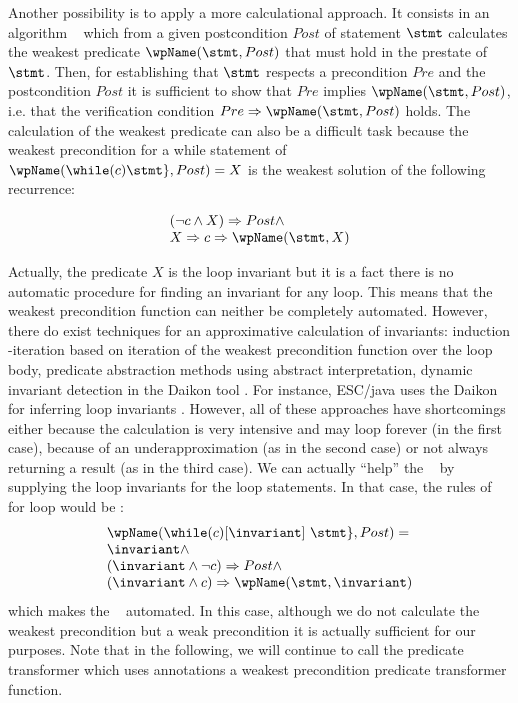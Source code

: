 Another possibility is to apply a  more calculational approach. It consists in an algorithm \wpName~ which 
from a given postcondition $Post$   of statement $\stmt$ calculates the weakest predicate $\wpName(\stmt, Post)$ 
that must hold in the  prestate of $\stmt$. Then, for establishing that
  $\stmt$ respects a precondition  $Pre$ and the postcondition   $Post$ it is sufficient to show that $Pre$ implies $\wpName(\stmt, Post) $, i.e. that 
the verification condition $Pre \Rightarrow \wpName(\stmt, Post)$ holds. 
The calculation of the weakest predicate can also be a difficult task because  the weakest precondition for a while statement of
$\wpName( \while ( c ) \do \{ \stmt \} ,Post) = X$ is the weakest solution of the following recurrence:

$$\begin{array}{l}
(\neg c \wedge X) \Rightarrow  Post \wedge \\
X \Rightarrow c \Rightarrow \wpName (\stmt, X) 
\end{array}$$
 
 Actually, the predicate $X$ is the loop invariant but it is a fact there is no automatic procedure for finding an invariant for any loop.
 This means that the weakest precondition function can neither be completely automated. However, there do exist techniques for an approximative calculation of invariants: 
induction -iteration  \cite{SI77IABC} based on iteration of the weakest precondition function over the loop body,
predicate abstraction methods \cite{FQ03PAQ} using abstract interpretation, dynamic invariant detection in the Daikon tool \cite{ernst99dynamically}.
For instance, ESC/java uses the Daikon  for inferring loop invariants \cite{NimmerE01:RV}.  
However, all of these approaches have shortcomings either because the calculation is very intensive and may loop forever (in the first case),
 because  of an underapproximation (as in the second case) or not always returning 
a result (as in the third case).  
We can actually ``help'' the \wpName~ by supplying the loop invariants for the loop statements.
 In that case, the rules of \wpName~ for loop would be :
$$ \begin{array}{l} 
    \wpName ( \while  ( c ) \lbrack \invariant \rbrack \  \do \{ \stmt \} ,Post) = \\
   \invariant \wedge \\
   (\invariant \wedge \neg c) \Rightarrow Post  \wedge \\
    (\invariant \wedge  c) \Rightarrow \wpName(\stmt, \invariant)
   \end{array} $$
which makes the \wpName~ automated.  In this case, although we do not calculate the weakest precondition but a weak precondition it is actually 
sufficient for our purposes. Note that in the following, we will continue to call  the predicate transformer which uses annotations a
 weakest precondition predicate transformer function. 

